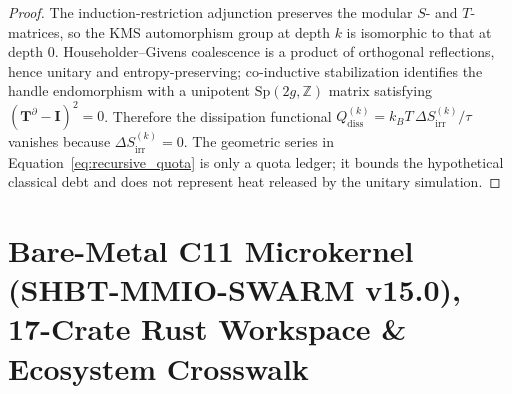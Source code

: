 \documentclass[11pt,onecolumn]{article}
\begin{document}
\begin{proof}
The induction-restriction adjunction preserves the modular $S$- and $T$-matrices, so the KMS automorphism group at depth $k$ is isomorphic to that at depth $0$. Householder--Givens coalescence is a product of orthogonal reflections, hence unitary and entropy-preserving; co-inductive stabilization identifies the handle endomorphism with a unipotent $\mathrm{Sp}(2g,\mathbb Z)$ matrix satisfying $(\mathbf T^\partial-\mathbf I)^2=0$. Therefore the dissipation functional $Q_{\text{diss}}^{(k)}=k_B T\,\Delta S_{\text{irr}}^{(k)}/\tau$ vanishes because $\Delta S_{\text{irr}}^{(k)}=0$. The geometric series in Equation~\eqref{eq:recursive_quota} is only a quota ledger; it bounds the hypothetical classical debt and does not represent heat released by the unitary simulation.
\end{proof}

\section{Bare-Metal C11 Microkernel (SHBT-MMIO-SWARM v15.0), 17-Crate Rust Workspace \& Ecosystem Crosswalk}
\label{sec:c11_microkernel_v11}
\end{document}
